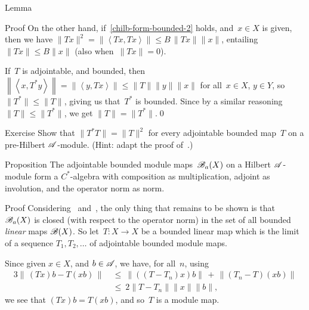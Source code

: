 \documentclass[a]{subfiles}
\begin{document}
\begin{parsec}
\begin{point}{Lemma}
\begin{point}{Proof}
On the other hand,
if~\ref{chilb-form-bounded-2} holds,
and~$x\in X$ is given,
then we have $\|Tx\|^2=\left\|\left<Tx,Tx\right>\right\|
\leq B \,\|Tx\|\|x\|$,
entailing $\|Tx\|\leq B\|x\|$
(also when~$\|Tx\|=0$).

If~$T$ is adjointable, and bounded,
then~$\left\|\left<x,T^*y\right>\right\|=\left\|\left<y,Tx\right>\right\|
\leq \|T\|\|y\|\|x\|$ for all~$x\in X$, $y\in Y$,
so~$\|T^*\|\leq \|T\|$,
giving us that~$T^*$ is bounded.
Since by a similar reasoning $\|T\|\leq \|T^*\|$,
we get $\|T\|=\|T^*\|$.\qed
\end{point}
\end{point}
\begin{point}{Exercise}%
Show that $\|T^*T\|=\|T\|^2$
for every adjointable bounded map~$T$ on a pre-Hilbert $\mathscr{A}$-module.
(Hint: adapt the proof of~.)
\end{point}
\begin{point}{Proposition}%
The adjointable bounded module maps~$\mathscr{B}_a(X)$
on a Hilbert $\mathscr{A}$-module
form a $C^*$-algebra
with composition as multiplication,
adjoint as involution,
and the operator norm as norm.
\begin{point}{Proof}%
Considering~
and~,
the only thing that remains to be shown is that~$\mathscr{B}_a(X)$
is closed (with respect to the operator norm)
in the set of all bounded \emph{linear} maps $\mathscr{B}(X)$.
So let~$T\colon X\to X$ be a bounded linear map
which is the limit of a sequence $T_1,T_2,\dotsc$
of adjointable bounded module maps.

Since given $x\in X$, and $b\in\mathscr{A}$, we have, for all~$n$,
using~
\begin{alignat*}{3}
\left\|\,(Tx)b-T(xb)\,\right\|
\ &\leq\ \left\|((T-T_n)x)b\right\|
\,+\,\left\|(T_n-T)(xb)\right\|
\\
&\leq\ 
2\|T-T_n\|\|x\|\|b\|,
\end{alignat*}
we see that $(Tx)b=T(xb)$, and so~$T$ is a module map.


\end{point}
\end{point}
\end{parsec}
\end{document}
